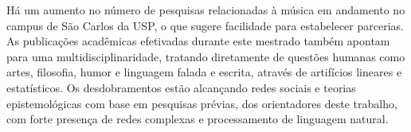 Há um aumento no número de pesquisas relacionadas à música em andamento no campus de São Carlos da USP, o que sugere facilidade para estabelecer parcerias.
As publicações acadêmicas efetivadas durante este mestrado também apontam para uma multidisciplinaridade,
tratando diretamente de questões humanas como artes, filosofia, humor e linguagem falada e escrita, através de artifícios lineares e estatísticos.\cite{FabbriSTAT,FabbriACL,FabbriComplenetVoz,FabbriComplenetTexto} Os desdobramentos estão alcançando redes sociais e teorias epistemológicas com base em pesquisas prévias, dos orientadores deste trabalho, com forte presença de redes complexas e processamento de linguagem natural. 
